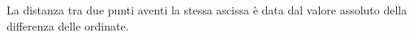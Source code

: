 La distanza tra due punti aventi la stessa ascissa è data dal valore assoluto della differenza delle
ordinate.